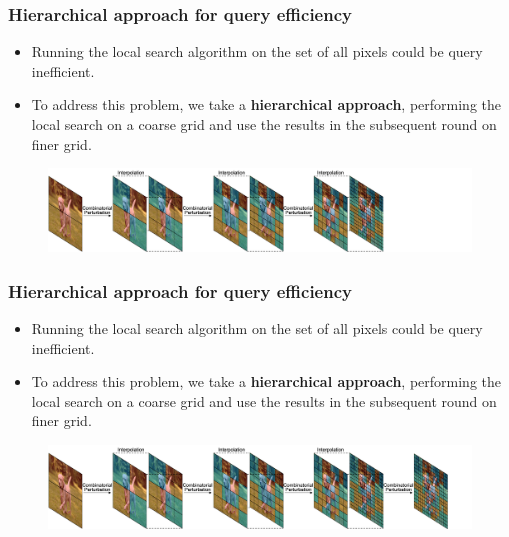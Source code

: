\documentclass[10pt,mathserif]{beamer}
\begin{document}
\begin{frame}
    \frametitle{Hierarchical approach for query efficiency}
    \begin{itemize}\itemsep=12pt
        \item Running the local search algorithm on the set of all pixels could be query inefficient.
        \item To address this problem, we take a \textbf{hierarchical approach}, performing the local search on a coarse grid and use the results in the subsequent round on finer grid.
    \end{itemize}
    \begin{figure}
        \centering
        \hspace*{-2.5em}
        \includegraphics[scale=0.35]{figures/hierarchical_4.png}
    \end{figure}
\end{frame}

\begin{frame}
    \frametitle{Hierarchical approach for query efficiency}
    \begin{itemize}\itemsep=12pt
        \item Running the local search algorithm on the set of all pixels could be query inefficient.
        \item To address this problem, we take a \textbf{hierarchical approach}, performing the local search on a coarse grid and use the results in the subsequent round on finer grid.
    \end{itemize}
    \begin{figure}
        \centering
        \hspace*{-2.5em}
        \includegraphics[scale=0.35]{figures/hierarchical_5.png}
    \end{figure}
\end{frame}

\end{document}
